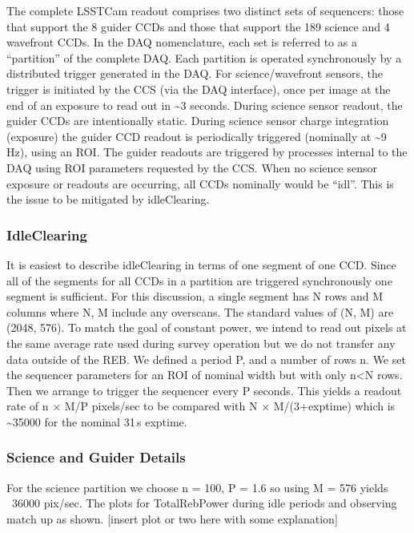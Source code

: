 The complete LSSTCam readout comprises two distinct sets of sequencers: those that support the 8 guider CCDs and those that support the 189 science and 4 wavefront CCDs. In the DAQ nomenclature, each set is referred to as a ``partition'' of the complete DAQ.  Each partition is operated synchronously by a distributed trigger generated in the DAQ. For science/wavefront sensors, the trigger is initiated by the CCS (via the DAQ interface), once per image at the end of an exposure to read out in \sim3 seconds. During science sensor readout, the guider CCDs are intentionally static. During science sensor charge integration (exposure) the guider CCD readout is periodically triggered (nominally at \sim9 Hz), using an ROI. The guider readouts are triggered by processes internal to the DAQ using ROI parameters requested by the CCS. When no science sensor exposure or readouts are occurring, all CCDs nominally would be ``idl''.  This is the issue to be mitigated by idleClearing.

\subsubsection{IdleClearing}

It is easiest to describe idleClearing in terms of one segment of one CCD. Since all of the segments for all CCDs in a partition are triggered synchronously one segment is sufficient. For this discussion, a single segment has N rows and M columns where N, M include any overscans. The standard values of (N, M) are (2048, 576).  To match the goal of constant power, we intend to read out pixels at the same average rate used during survey operation but we do not transfer any data outside of the REB. We defined a period P, and a number of rows n. We set the sequencer parameters for an ROI of nominal width but with only n<N rows.  Then we arrange to trigger the sequencer every P seconds. This yields a readout rate of n $\times$ M/P pixels/sec to be compared with N $\times$ M/(3+exptime) which is \sim35000 for the nominal 31\,s exptime.

\subsubsection{Science and Guider Details}

For the science partition we choose n = 100, P = 1.6 so using M = 576 yields ~36000 pix/sec.  The plots for TotalRebPower during idle periods and observing match up as shown.  
[insert plot or two here with some explanation]

